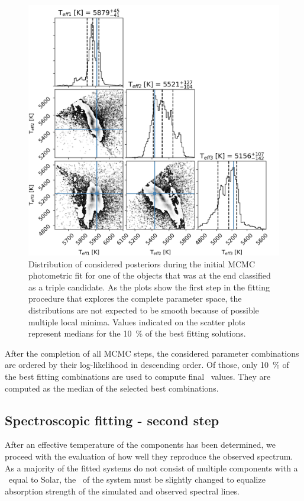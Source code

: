 \begin{figure}
	\centering
	\includegraphics[width=\textwidth]{150408004101169_p1884_corner_3star_00.png}
	\caption{Distribution of considered posteriors during the initial MCMC photometric fit for one of the objects that was at the end classified as a triple candidate. As the plots show the first step in the fitting procedure that explores the complete parameter space, the distributions are not expected to be smooth because of possible multiple local minima. Values indicated on the scatter plots represent medians for the 10~\% of the best fitting solutions.}
	\label{fig:posterior_dist}
\end{figure}

After the completion of all MCMC steps, the considered parameter combinations are ordered by their log-likelihood in descending order. Of those, only 10~\% of the best fitting combinations are used to compute final \Teffn{[1-3]}\ values. They are computed as the median of the selected best combinations. 

\subsection{Spectroscopic fitting - second step}
\label{sec:spectrum_fit}
After an effective temperature of the components has been determined, we proceed with the evaluation of how well they reproduce the observed spectrum. As a majority of the fitted systems do not consist of multiple components with a \Teff\ equal to Solar, the \Feh\ of the system must be slightly changed to equalize absorption strength of the simulated and observed spectral lines.

